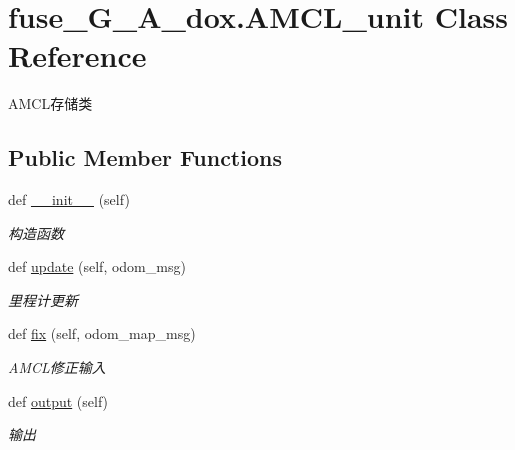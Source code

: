 \hypertarget{classfuse___g___a__dox_1_1_a_m_c_l__unit}{}\section{fuse\+\_\+\+G\+\_\+\+A\+\_\+dox.\+A\+M\+C\+L\+\_\+unit Class Reference}
\label{classfuse___g___a__dox_1_1_a_m_c_l__unit}


A\+M\+C\+L存储类  


\subsection*{Public Member Functions}
\begin{DoxyCompactItemize}
\item 
def \hyperlink{classfuse___g___a__dox_1_1_a_m_c_l__unit_ac997c63c12d51affaf29aea632ee25e1}{\+\_\+\+\_\+init\+\_\+\+\_\+} (self)
\begin{DoxyCompactList}\small\item\em 构造函数 \end{DoxyCompactList}\item 
def \hyperlink{classfuse___g___a__dox_1_1_a_m_c_l__unit_a0a0619c5c86913eff529d9f539e01ebc}{update} (self, odom\+\_\+msg)
\begin{DoxyCompactList}\small\item\em 里程计更新 \end{DoxyCompactList}\item 
def \hyperlink{classfuse___g___a__dox_1_1_a_m_c_l__unit_aef7456a0a6ea842a4f63582841f3e172}{fix} (self, odom\+\_\+map\+\_\+msg)
\begin{DoxyCompactList}\small\item\em A\+M\+C\+L修正输入 \end{DoxyCompactList}\item 
def \hyperlink{classfuse___g___a__dox_1_1_a_m_c_l__unit_ae0075e16c909e7230a2553255f45b8fd}{output} (self)
\begin{DoxyCompactList}\small\item\em 输出 \end{DoxyCompactList}\end{DoxyCompactItemize}
